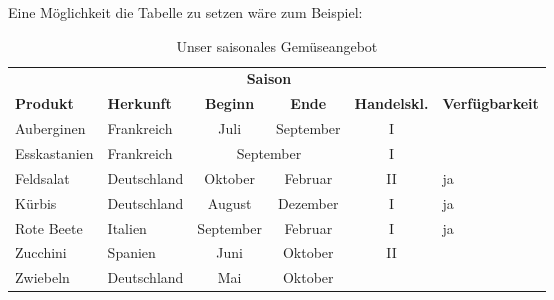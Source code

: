 % 

Eine Möglichkeit die Tabelle zu setzen wäre zum Beispiel:

\begin{LTXexample}[pos=b]
\begin{table}
  \centering
  \caption{Unser saisonales Gemüseangebot}
  \begin{tabular}{llcccl}
    \toprule
    && \multicolumn{2}{c}{\textbf{Saison}} \\
    \cmidrule{3-4}
    \textbf{Produkt} & \textbf{Herkunft} & \textbf{Beginn} & \textbf{Ende} & \textbf{Handelskl.} & \textbf{Verfügbarkeit}\\
    \midrule
    Auberginen & Frankreich & Juli & September & I &  \\
    Esskastanien & Frankreich & \multicolumn{2}{c}{September} & I &  \\
    Feldsalat & Deutschland & Oktober & Februar & II & ja \\
    Kürbis & Deutschland & August & Dezember & I & ja\\
    Rote Beete & Italien & September & Februar & I  & ja\\
    Zucchini & Spanien & Juni & Oktober & II &  \\
    Zwiebeln & Deutschland & Mai & Oktober &  & \\
    \bottomrule
  \end{tabular}
\end{table}
\end{LTXexample}
